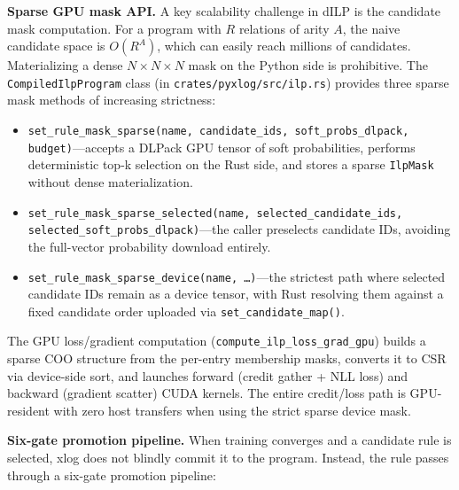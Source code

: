 \textbf{Sparse GPU mask API.} A key scalability challenge in dILP is the candidate mask computation. For a program with $R$ relations of arity $A$, the naive candidate space is $O(R^A)$, which can easily reach millions of candidates. Materializing a dense $N \times N \times N$ mask on the Python side is prohibitive. The \texttt{CompiledIlpProgram} class (in \texttt{crates/pyxlog/src/ilp.rs}) provides three sparse mask methods of increasing strictness:

\begin{itemize}
  \item \texttt{set\_rule\_mask\_sparse(name, candidate\_ids, soft\_probs\_dlpack, budget)}---accepts a DLPack GPU tensor of soft probabilities, performs deterministic top-k selection on the Rust side, and stores a sparse \texttt{IlpMask} without dense materialization.
  \item \texttt{set\_rule\_mask\_sparse\_selected(name, selected\_candidate\_ids, selected\_soft\_probs\_dlpack)}---the caller preselects candidate IDs, avoiding the full-vector probability download entirely.
  \item \texttt{set\_rule\_mask\_sparse\_device(name, \ldots)}---the strictest path where selected candidate IDs remain as a device tensor, with Rust resolving them against a fixed candidate order uploaded via \texttt{set\_candidate\_map()}.
\end{itemize}

The GPU loss/gradient computation (\texttt{compute\_ilp\_loss\_grad\_gpu}) builds a sparse COO structure from the per-entry membership masks, converts it to CSR via device-side sort, and launches forward (credit gather + NLL loss) and backward (gradient scatter) CUDA kernels. The entire credit/loss path is GPU-resident with zero host transfers when using the strict sparse device mask.

\textbf{Six-gate promotion pipeline.} When training converges and a candidate rule is selected, xlog does not blindly commit it to the program. Instead, the rule passes through a six-gate promotion pipeline:

